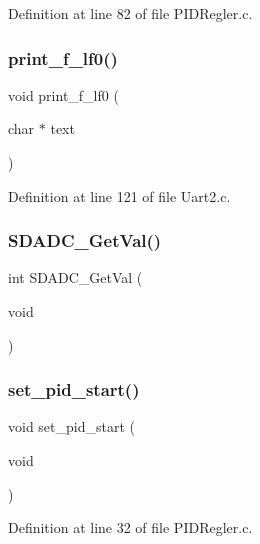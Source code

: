 Definition at line 82 of file P\+I\+D\+Regler.\+c.

\mbox{\label{_p_i_d_regler_8c_a4f2540c2811f6e4c4c136f964b5b8545}} 
\subsubsection{print\+\_\+f\+\_\+lf0()}
{\footnotesize\ttfamily void print\+\_\+f\+\_\+lf0 (\begin{DoxyParamCaption}\item[{char $\ast$}]{text }\end{DoxyParamCaption})}



Definition at line 121 of file Uart2.\+c.

\mbox{\label{_p_i_d_regler_8c_ae5bd1779e80bc9fa9b4221eb6df40ecd}} 
\subsubsection{S\+D\+A\+D\+C\+\_\+\+Get\+Val()}
{\footnotesize\ttfamily int S\+D\+A\+D\+C\+\_\+\+Get\+Val (\begin{DoxyParamCaption}\item[{void}]{ }\end{DoxyParamCaption})}

\mbox{\label{_p_i_d_regler_8c_a295254d87ad35bad08a608988bdb4fd3}} 
\subsubsection{set\+\_\+pid\+\_\+start()}
{\footnotesize\ttfamily void set\+\_\+pid\+\_\+start (\begin{DoxyParamCaption}\item[{void}]{ }\end{DoxyParamCaption})}



Definition at line 32 of file P\+I\+D\+Regler.\+c.

